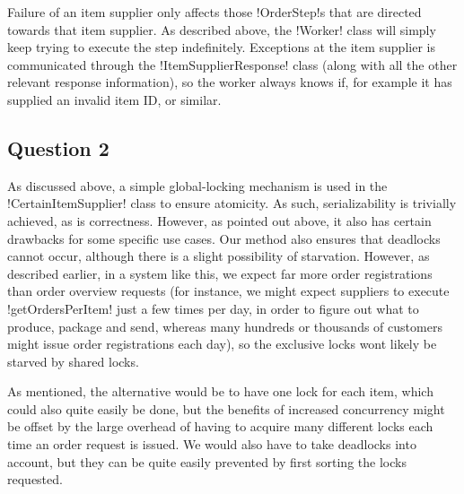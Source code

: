 \documentclass[a4paper, 12pt]{article}
\begin{document}

Failure of an item supplier only affects those !OrderStep!s that are
directed towards that item supplier. As described above, the !Worker!
class will simply keep trying to execute the step
indefinitely. Exceptions at the item supplier is communicated through
the !ItemSupplierResponse! class (along with all the other relevant
response information), so the worker always knows if, for example it
has supplied an invalid item ID, or similar.

\subsection*{Question 2}





As discussed above, a simple global-locking mechanism is used in the
!CertainItemSupplier! class to ensure atomicity. As such,
serializability is trivially achieved, as is correctness. However, as
pointed out above, it also has certain drawbacks for some specific use
cases. Our method also ensures that deadlocks cannot occur, although
there is a slight possibility of starvation. However, as described
earlier, in a system like this, we expect far more order registrations
than order overview requests (for instance, we might expect suppliers
to execute !getOrdersPerItem! just a few times per day, in order to
figure out what to produce, package and send, whereas many hundreds or
thousands of customers might issue order registrations each day), so
the exclusive locks wont likely be starved by shared locks.

As mentioned, the alternative would be to have one lock for each item,
which could also quite easily be done, but the benefits of increased
concurrency might be offset by the large overhead of having to acquire
many different locks each time an order request is
issued. We would also have to take deadlocks into account, but they
can be quite easily prevented by first sorting the locks requested.
\end{document}
